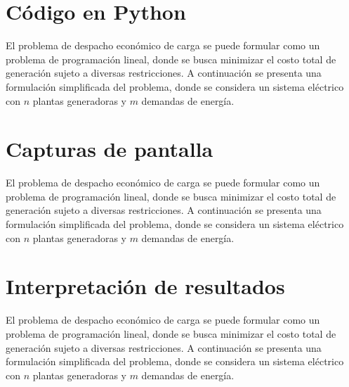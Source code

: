 \documentclass[11pt]{article}
\begin{document}
\newpage
\section{Código en Python}
El problema de despacho económico de carga se puede formular como un problema de programación lineal, donde se busca minimizar el costo total de generación sujeto a diversas restricciones. A continuación se presenta una formulación simplificada del problema, donde se considera un sistema eléctrico con $n$ plantas generadoras y $m$ demandas de energía.

\newpage
\section{Capturas de pantalla}
El problema de despacho económico de carga se puede formular como un problema de programación lineal, donde se busca minimizar el costo total de generación sujeto a diversas restricciones. A continuación se presenta una formulación simplificada del problema, donde se considera un sistema eléctrico con $n$ plantas generadoras y $m$ demandas de energía.

\newpage
\section{Interpretación de resultados}	
El problema de despacho económico de carga se puede formular como un problema de programación lineal, donde se busca minimizar el costo total de generación sujeto a diversas restricciones. A continuación se presenta una formulación simplificada del problema, donde se considera un sistema eléctrico con $n$ plantas generadoras y $m$ demandas de energía.
\end{document}
